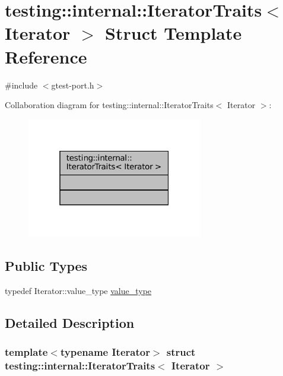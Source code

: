\hypertarget{structtesting_1_1internal_1_1IteratorTraits}{}\section{testing\+:\+:internal\+:\+:Iterator\+Traits$<$ Iterator $>$ Struct Template Reference}
\label{structtesting_1_1internal_1_1IteratorTraits}


{\ttfamily \#include $<$gtest-\/port.\+h$>$}



Collaboration diagram for testing\+:\+:internal\+:\+:Iterator\+Traits$<$ Iterator $>$\+:
\nopagebreak
\begin{figure}[H]
\begin{center}
\leavevmode
\includegraphics[width=217pt]{structtesting_1_1internal_1_1IteratorTraits__coll__graph}
\end{center}
\end{figure}
\subsection*{Public Types}
\begin{DoxyCompactItemize}
\item 
typedef Iterator\+::value\+\_\+type \hyperlink{structtesting_1_1internal_1_1IteratorTraits_a29de4320a9c53ce438d3561b94e515bb}{value\+\_\+type}
\end{DoxyCompactItemize}


\subsection{Detailed Description}
\subsubsection*{template$<$typename Iterator$>$\newline
struct testing\+::internal\+::\+Iterator\+Traits$<$ Iterator $>$}




